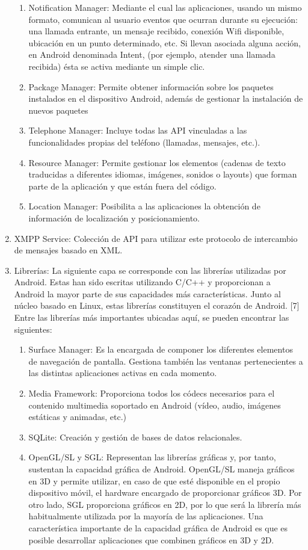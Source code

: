 \begin{enumerate}
\begin{enumerate}
\item	Notification Manager: Mediante el cual las aplicaciones, usando un mismo formato, comunican al usuario eventos que ocurran durante su ejecución: una llamada entrante, un mensaje recibido, conexión Wifi disponible, ubicación en un punto determinado, etc. Si llevan asociada alguna acción, en Android denominada Intent, (por ejemplo, atender una llamada recibida) ésta se activa mediante un simple clic.
\item	Package Manager: Permite obtener información sobre los paquetes instalados en el dispositivo Android, además de gestionar la instalación de nuevos paquetes 
\item	Telephone Manager: Incluye todas las API vinculadas a las funcionalidades propias del teléfono (llamadas, mensajes, etc.).
\item	Resource Manager: Permite gestionar los elementos (cadenas de texto traducidas a diferentes idiomas, imágenes, sonidos o layouts) que forman parte de la aplicación y que están fuera del código.
\item	Location Manager: Posibilita a las aplicaciones la obtención de información de localización y posicionamiento.
\end{enumerate}
\item XMPP Service: Colección de API para utilizar este protocolo de intercambio de mensajes basado en XML. 
\item	Librerías: La siguiente capa se corresponde con las librerías utilizadas por Android. Estas han sido escritas utilizando C/C++ y proporcionan a Android la mayor parte de sus capacidades más características. Junto al núcleo basado en Linux, estas librerías constituyen el corazón de Android. [7]
Entre las librerías más importantes ubicadas aquí, se pueden encontrar las siguientes:
\begin{enumerate}
\item	Surface Manager: Es la encargada de componer los diferentes elementos de navegación de pantalla. Gestiona también las ventanas pertenecientes a las distintas aplicaciones activas en cada momento.
\item	Media Framework: Proporciona todos los códecs necesarios para el contenido multimedia soportado en Android (vídeo, audio, imágenes estáticas y animadas, etc.)
\item	SQLite: Creación y gestión de bases de datos relacionales.
\item	OpenGL/SL y SGL: Representan las librerías gráficas y, por tanto, sustentan la capacidad gráfica de Android. OpenGL/SL maneja gráficos en 3D y permite utilizar, en caso de que esté disponible en el propio dispositivo móvil, el hardware encargado de proporcionar gráficos 3D. Por otro lado, SGL proporciona gráficos en 2D, por lo que será la librería más habitualmente utilizada por la mayoría de las aplicaciones. Una característica importante de la capacidad gráfica de Android es que es posible desarrollar aplicaciones que combinen gráficos en 3D y 2D.

\end{enumerate}
\end{enumerate}
